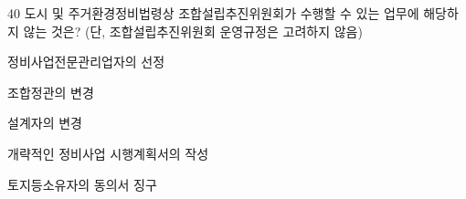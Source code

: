 \begin{question}{40}
도시 및 주거환경정비법령상 조합설립추진위원회가 수행할 수 있는 업무에 해당하지 않는 것은? (단, 조합설립추진위원회 운영규정은 고려하지 않음)
\begin{choices}
  \item 정비사업전문관리업자의 선정
  \item 조합정관의 변경
  \item 설계자의 변경
  \item 개략적인 정비사업 시행계획서의 작성
  \item 토지등소유자의 동의서 징구
\end{choices}
\end{question}
